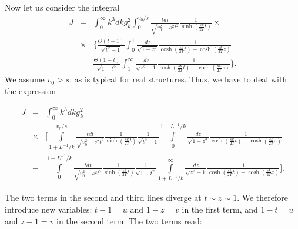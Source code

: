 Now let us consider the integral
%
\begin{eqnarray}\label{AP7_int.1}
J&=&\int_0^\infty k^3dkg^2_k
\int_0^{v_0/s}
\frac{tdt}{\sqrt{v_0^2-s^2t^2}}
\frac{1}{\sinh(\frac{sk}{2T}t)}\times\\\nonumber
&\times&\Big\{
\frac{\Theta(t-1)}{\sqrt{t^2-1}}
\int_0^1\frac{dz}{\sqrt{1-z^2}}
\frac{1}{\cosh(\frac{sk}{2T}t)-\cosh(\frac{sk}{2T}z)} \\ \nonumber
&-& \frac{\Theta(1-t)}{\sqrt{1-t^2}}
\int_1^\infty \frac{dz}{\sqrt{z^2-1}}   \frac{1}{\cosh(\frac{sk}{2T}t)-\cosh(\frac{sk}{2T}z)}
\Big\}.
\end{eqnarray}
%
We assume $v_0>s$, as is typical for real structures. Thus, we have to deal with the expression
%
\begin{small}
\begin{eqnarray}
\label{int.2}
J&=&\int_0^\infty k^3dkg^2_k
\\
\nonumber
    &\times& \Biggl[
\int\limits_{1+L^{-1}/k}^{v_0/s}
\frac{tdt}{\sqrt{v_0^2-s^2t^2}}
\frac{1}{\sinh(\frac{sk}{2T}t)}\frac{1}{\sqrt{t^2-1}}
\int\limits_0^{1-L^{-1}/k}\frac{dz}{\sqrt{1-z^2}}
\frac{1}{\cosh(\frac{sk}{2T}t)-\cosh(\frac{sk}{2T}z)}\\
\nonumber
    &-&
\int\limits_0^{1-L^{-1}/k}
\frac{tdt}{\sqrt{v_0^2-s^2t^2}}
\frac{1}{\sinh(\frac{sk}{2T}t)}\frac{1}{\sqrt{1-t^2}}
\int\limits_{1+L^{-1}/k}^\infty \frac{dz}{\sqrt{z^2-1}}   \frac{1}{\cosh(\frac{sk}{2T}t)-\cosh(\frac{sk}{2T}z)}
\Biggr].
\end{eqnarray}
\end{small}
The two terms in the second and third lines diverge at $t\sim z\sim 1$. We therefore introduce new variables: $t-1=u$ and $1-z=v$ in the first term, and $1-t=u$ and $z-1=v$ in the second term. The two terms read:

